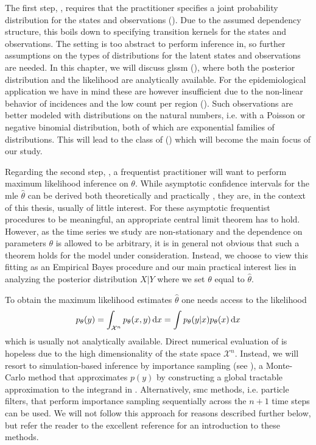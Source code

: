 The first step, , requires that the practitioner specifies a joint probability distribution for the states and observations ().
Due to the assumed dependency structure, this boils down to specifying transition kernels for the states and observations.
The setting  is too abstract to perform inference in, so further assumptions on the types of distributions for the latent states and observations are needed.
In this chapter, we will discuss \gls{glssm}  (), where both the posterior distribution and the likelihood are analytically available. For the epidemiological application we have in mind these are however insufficient due to the non-linear behavior of incidences and the low count per region ().
Such observations are better modeled with distributions on the natural numbers, i.e. with a Poisson or negative binomial distribution, both of which are exponential families of distributions. This will lead to the class of  () which will become the main focus of our study.

Regarding the second step, , a frequentist practitioner will want to perform maximum likelihood inference on $\theta$.
While asymptotic confidence intervals for the \gls{mle} $\hat\theta$ can be derived both theoretically and practically \citep[Chapter 7]{Durbin2012Time}, they are, in the context of this thesis, usually of little interest. For these asymptotic frequentist procedures to be meaningful, an appropriate central limit theorem has to hold. However, as the time series we study are non-stationary and the dependence on parameters $\theta$ is allowed to be arbitrary, it is in general not obvious that such a theorem holds for the model under consideration. Instead, we choose to view this fitting as an Empirical Bayes procedure and our main practical interest lies in analyzing the posterior distribution $X|Y$ where we set $\theta$ equal to $\hat\theta$. 


To obtain the maximum likelihood estimates $\hat\theta$ one needs access to the likelihood
\begin{align}
    \label{eq:likelihood}
    p_{\theta}(y) = \int_{\mathcal X^n} p_{\theta}(x,y) \,\mathrm d x = \int p_{\theta}(y|x) p_{\theta}(x) \,\mathrm d x
\end{align}
which is usually not analytically available.
Direct numerical evaluation of  is hopeless due to the high dimensionality of the state space $\mathcal X^n$.
Instead, we will resort to simulation-based inference by importance sampling (see ), a Monte-Carlo method that approximates $p(y)$ by constructing a global tractable approximation to the integrand in . Alternatively, \gls{smc} methods, i.e. particle filters, that perform importance sampling sequentially across the $n + 1$ time steps can be used. We will not follow this approach for reasons described further below, but refer the reader to the excellent reference \citep{Chopin2020Introduction} for an introduction to these methods.

